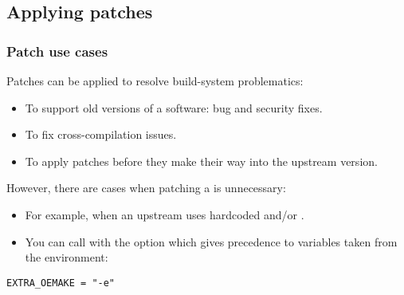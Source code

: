 \subsection{Applying patches}

\begin{frame}[fragile]
  \frametitle{Patch use cases}
  Patches can be applied to resolve build-system problematics:
  \begin{itemize}
    \item To support old versions of a software: bug and security
      fixes.
    \item To fix cross-compilation issues.
    \item To apply patches before they make their way into the upstream
      version.
  \end{itemize}
  However, there are cases when patching a  is unnecessary:
  \begin{itemize}
    \item For example, when an upstream  uses hardcoded
           and/or .
    \item You can call  with the  option
	  which gives precedence to variables taken from the
          environment:
  \end{itemize}
  \begin{block}{}
    \begin{verbatim}
EXTRA_OEMAKE = "-e"
    \end{verbatim}
  \end{block}
\end{frame}

